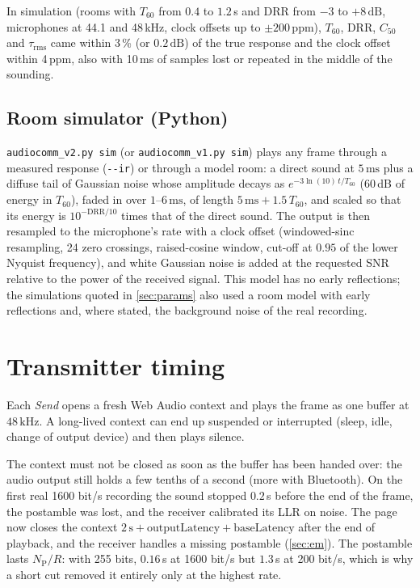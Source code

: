 \documentclass[11pt,a4paper]{article}
\newcommand{\kHz}{\,\mathrm{kHz}}
\newcommand{\ms}{\,\mathrm{ms}}
\newcommand{\dB}{\,\mathrm{dB}}
\newcommand{\code}[1]{\texttt{#1}}
\newcommand{\NP}{N_{\mathrm{P}}}
\theoremstyle{remark}
\begin{document}
In simulation (rooms with $T_{60}$ from $0.4$ to $1.2$\,s and DRR from $-3$ to $+8\dB$, microphones at 44.1 and 48\,kHz, clock offsets up to $\pm 200$\,ppm), $T_{60}$, DRR, $C_{50}$ and $\tau_{\mathrm{rms}}$ came within 3\,\% (or $0.2\dB$) of the true response and the clock offset within 4\,ppm, also with 10\,ms of samples lost or repeated in the middle of the sounding.

\subsection{Room simulator (Python)}
\label{sec:roomsim}
\code{audiocomm\_v2.py sim} (or \code{audiocomm\_v1.py sim}) plays any frame through a measured response (\code{-{}-ir}) or through a model room: a direct sound at $5\ms$ plus a diffuse tail of Gaussian noise whose amplitude decays as $e^{-3\ln(10)\, t/T_{60}}$ (60\,dB of energy in $T_{60}$), faded in over $1$--$6\ms$, of length $5\ms + 1.5\,T_{60}$, and scaled so that its energy is $10^{-\mathrm{DRR}/10}$ times that of the direct sound. The output is then resampled to the microphone's rate with a clock offset (windowed-sinc resampling, 24 zero crossings, raised-cosine window, cut-off at $0.95$ of the lower Nyquist frequency), and white Gaussian noise is added at the requested SNR relative to the power of the received signal. This model has no early reflections; the simulations quoted in \cref{sec:params} also used a room model with early reflections and, where stated, the background noise of the real recording.

\section{Transmitter timing}
\label{sec:txend}
Each \emph{Send} opens a fresh Web Audio context and plays the frame as one buffer at $48\kHz$. A long-lived context can end up suspended or interrupted (sleep, idle, change of output device) and then plays silence.

The context must not be closed as soon as the buffer has been handed over: the audio output still holds a few tenths of a second (more with Bluetooth). On the first real 1600 bit/s recording the sound stopped $0.2$\,s before the end of the frame, the postamble was lost, and the receiver calibrated its LLR on noise. The page now closes the context $2\,\text{s} + \text{outputLatency} + \text{baseLatency}$ after the end of playback, and the receiver handles a missing postamble (\cref{sec:em}). The postamble lasts $\NP/R$: with 255 bits, $0.16$\,s at 1600 bit/s but $1.3$\,s at 200 bit/s, which is why a short cut removed it entirely only at the highest rate.
\end{document}
